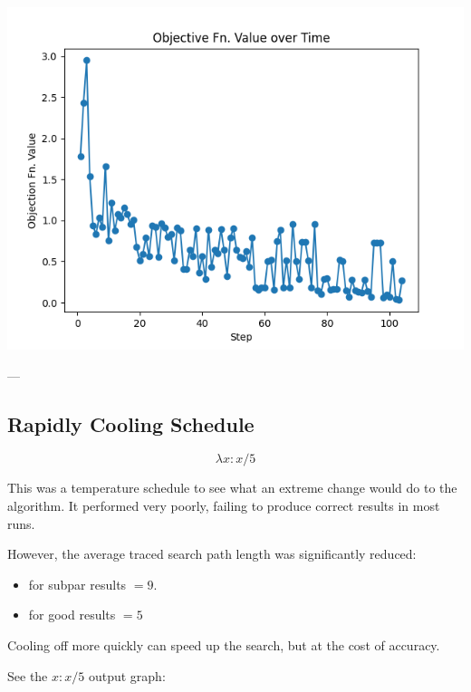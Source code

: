 \documentclass{article}
\begin{document}
\includegraphics[width=6in]{_static/Figure_10_Temp=1.22_Obj-Fn-over-Time.png}

---

\subsection{Rapidly Cooling Schedule}

$$\lambda x : x / 5$$

This was a temperature schedule to see what an extreme change would do to the algorithm. 
It performed very poorly, failing to produce correct results in most runs.

However, the average traced search path length was significantly reduced:

\begin{itemize}
    \item for subpar results $= 9$.
    \item for good results $= 5$
\end{itemize}

Cooling off more quickly can speed up the search, but at the cost of accuracy.

See the $x : x / 5$ output graph:
\end{document}
